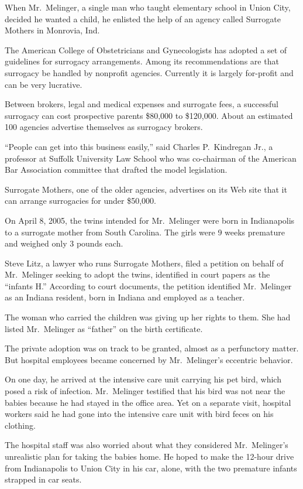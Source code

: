 ﻿\documentclass[12pt]{article}
\begin{document}
When Mr.~Melinger, a single man who taught elementary school in Union City, decided he wanted a
child, he enlisted the help of an agency called Surrogate Mothers in Monrovia, Ind.

The American College of Obstetricians and Gynecologists has adopted a set of guidelines for
surrogacy arrangements. Among its recommendations are that surrogacy be handled by nonprofit
agencies. Currently it is largely for-profit and can be very lucrative.

Between brokers, legal and medical expenses and surrogate fees, a successful surrogacy can cost
prospective parents \$80,000 to \$120,000. About an estimated 100 agencies advertise themselves as
surrogacy brokers.

``People can get into this business easily,'' said Charles P.~Kindregan Jr., a professor at Suffolk
University Law School who was co-chairman of the American Bar Association committee that drafted the
model legislation.

Surrogate Mothers, one of the older agencies, advertises on its Web site that it can arrange
surrogacies for under \$50,000.

On April 8, 2005, the twins intended for Mr.~Melinger were born in Indianapolis to a surrogate
mother from South Carolina. The girls were 9 weeks premature and weighed only 3 pounds each.

Steve Litz, a lawyer who runs Surrogate Mothers, filed a petition on behalf of Mr.~Melinger seeking
to adopt the twins, identified in court papers as the ``infants H.'' According to court documents,
the petition identified Mr.~Melinger as an Indiana resident, born in Indiana and employed as a
teacher.

The woman who carried the children was giving up her rights to them. She had listed Mr.~Melinger as
``father'' on the birth certificate.

The private adoption was on track to be granted, almost as a perfunctory matter. But hospital
employees became concerned by Mr.~Melinger's eccentric behavior.

On one day, he arrived at the intensive care unit carrying his pet bird, which posed a risk of
infection. Mr.~Melinger testified that his bird was not near the babies because he had stayed in the
office area. Yet on a separate visit, hospital workers said he had gone into the intensive care unit
with bird feces on his clothing.

The hospital staff was also worried about what they considered Mr.~Melinger's unrealistic plan for
taking the babies home. He hoped to make the 12-hour drive from Indianapolis to Union City in his
car, alone, with the two premature infants strapped in car seats.
\end{document}
